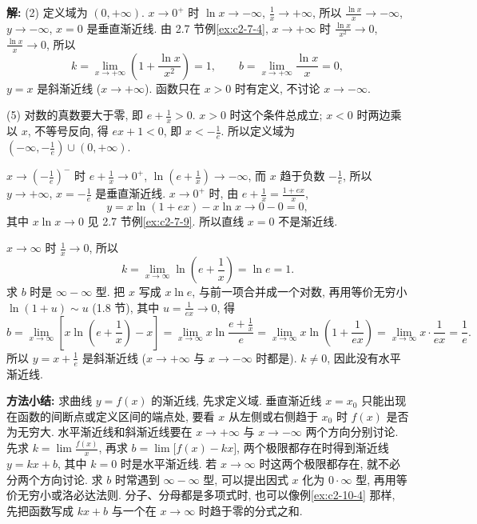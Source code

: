 \documentclass[UTF8,openany]{ctexbook}
\theoremstyle{chinesetextbook}
\newenvironment{cnsolution}{\par\indent\textbf{解:} \ignorespaces}{\par}
\begin{document}
\begin{cnsolution}
(2) 定义域为 $(0,+\infty)$. $x\to0^+$ 时 $\ln x\to-\infty$, $\displaystyle\frac1x\to+\infty$, 所以 $\displaystyle\frac{\ln x}x\to-\infty$, $y\to-\infty$, $x=0$ 是垂直渐近线. 由 2.7 节例\ref{ex:c2-7-4}, $x\to+\infty$ 时 $\displaystyle\frac{\ln x}{x^2}\to0$, $\displaystyle\frac{\ln x}x\to0$, 所以
\[
k=\lim_{x\to+\infty}\left(1+\frac{\ln x}{x^2}\right)=1,\qquad b=\lim_{x\to+\infty}\frac{\ln x}x=0,
\]
$y=x$ 是斜渐近线 ($x\to+\infty$). 函数只在 $x>0$ 时有定义, 不讨论 $x\to-\infty$.

(5) 对数的真数要大于零, 即 $\displaystyle e+\frac1x>0$. $x>0$ 时这个条件总成立; $x<0$ 时两边乘以 $x$, 不等号反向, 得 $ex+1<0$, 即 $\displaystyle x<-\frac1e$. 所以定义域为 $\displaystyle\left(-\infty,-\frac1e\right)\cup(0,+\infty)$.

$\displaystyle x\to\left(-\frac1e\right)^-$ 时 $\displaystyle e+\frac1x\to0^+$, $\displaystyle\ln\left(e+\frac1x\right)\to-\infty$, 而 $x$ 趋于负数 $\displaystyle-\frac1e$, 所以 $y\to+\infty$, $\displaystyle x=-\frac1e$ 是垂直渐近线. $x\to0^+$ 时, 由 $\displaystyle e+\frac1x=\frac{1+ex}x$,
\[
y=x\ln(1+ex)-x\ln x\to0-0=0,
\]
其中 $x\ln x\to0$ 见 2.7 节例\ref{ex:c2-7-9}. 所以直线 $x=0$ 不是渐近线.

$x\to\infty$ 时 $\displaystyle\frac1x\to0$, 所以
\[
k=\lim_{x\to\infty}\ln\left(e+\frac1x\right)=\ln e=1.
\]
求 $b$ 时是 $\infty-\infty$ 型. 把 $x$ 写成 $x\ln e$, 与前一项合并成一个对数, 再用等价无穷小 $\ln(1+u)\sim u$ (1.8 节), 其中 $\displaystyle u=\frac1{ex}\to0$, 得
\[
b=\lim_{x\to\infty}\left[x\ln\left(e+\frac1x\right)-x\right]=\lim_{x\to\infty}x\ln\frac{e+\frac1x}e=\lim_{x\to\infty}x\ln\left(1+\frac1{ex}\right)=\lim_{x\to\infty}x\cdot\frac1{ex}=\frac1e.
\]
所以 $\displaystyle y=x+\frac1e$ 是斜渐近线 ($x\to+\infty$ 与 $x\to-\infty$ 时都是). $k\ne0$, 因此没有水平渐近线.
\end{cnsolution}
\par\indent\textbf{方法小结:} 求曲线 $y=f(x)$ 的渐近线, 先求定义域. 垂直渐近线 $x=x_0$ 只能出现在函数的间断点或定义区间的端点处, 要看 $x$ 从左侧或右侧趋于 $x_0$ 时 $f(x)$ 是否为无穷大. 水平渐近线和斜渐近线要在 $x\to+\infty$ 与 $x\to-\infty$ 两个方向分别讨论. 先求 $\displaystyle k=\lim\frac{f(x)}x$, 再求 $\displaystyle b=\lim\bigl[f(x)-kx\bigr]$, 两个极限都存在时得到渐近线 $y=kx+b$, 其中 $k=0$ 时是水平渐近线. 若 $x\to\infty$ 时这两个极限都存在, 就不必分两个方向讨论. 求 $b$ 时常遇到 $\infty-\infty$ 型, 可以提出因式 $x$ 化为 $0\cdot\infty$ 型, 再用等价无穷小或洛必达法则. 分子、分母都是多项式时, 也可以像例\ref{ex:c2-10-4} 那样, 先把函数写成 $kx+b$ 与一个在 $x\to\infty$ 时趋于零的分式之和.
\end{document}
